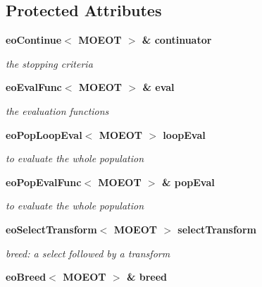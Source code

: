 \subsection*{Protected Attributes}
\begin{CompactItemize}
\item 
\bf{eo\-Continue}$<$ MOEOT $>$ \& \bf{continuator}\label{classmoeoEasyEA_5f5b76acbaf99a6a3ee2710da07dde29}

\begin{CompactList}\small\item\em the stopping criteria \item\end{CompactList}\item 
\bf{eo\-Eval\-Func}$<$ MOEOT $>$ \& \bf{eval}\label{classmoeoEasyEA_26e8ebce6a1bc3216e20171688ba6b83}

\begin{CompactList}\small\item\em the evaluation functions \item\end{CompactList}\item 
\bf{eo\-Pop\-Loop\-Eval}$<$ MOEOT $>$ \bf{loop\-Eval}\label{classmoeoEasyEA_c1d492090805bf322c07159a9238a7ae}

\begin{CompactList}\small\item\em to evaluate the whole population \item\end{CompactList}\item 
\bf{eo\-Pop\-Eval\-Func}$<$ MOEOT $>$ \& \bf{pop\-Eval}\label{classmoeoEasyEA_189a8f5196844907ff71f386d95bf415}

\begin{CompactList}\small\item\em to evaluate the whole population \item\end{CompactList}\item 
\bf{eo\-Select\-Transform}$<$ MOEOT $>$ \bf{select\-Transform}\label{classmoeoEasyEA_bd69a176f3cacc2694342075a9022f74}

\begin{CompactList}\small\item\em breed: a select followed by a transform \item\end{CompactList}\item 
\bf{eo\-Breed}$<$ MOEOT $>$ \& \bf{breed}\label{classmoeoEasyEA_35d5909694019d1b0d52347c72a9092e}


\end{CompactItemize}
